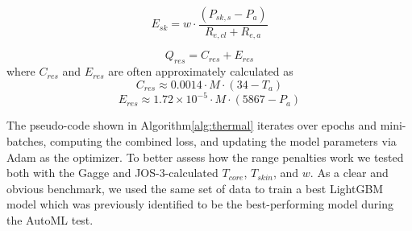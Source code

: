     \begin{equation}
        E_{sk} = w \cdot \frac{(P_{sk,s} - P_a)}{R_{e,cl} + R_{e,a}}
    \end{equation}
    
    \begin{equation}
        Q_{res} = C_{res} + E_{res}
    \end{equation}
where  $C_{res}$ and $E_{res}$ are often approximately calculated as
    \begin{equation}
        C_{res} \approx 0.0014 \cdot M \cdot (34 - T_a)
    \end{equation}
    \begin{equation}
        E_{res} \approx 1.72 \times 10^{-5} \cdot M \cdot (5867 - P_a)\label{eq:eres}
    \end{equation}

The pseudo-code shown in Algorithm\ref{alg:thermal} iterates over epochs and mini-batches, computing the combined loss, and updating the model parameters via Adam as the optimizer. To better assess how the range penalties work we tested both with the Gagge and JOS-3-calculated $T_{core}$, $T_{skin}$, and $w$. As a clear and obvious benchmark, we used the same set of data to train a best LightGBM model which was previously identified to be the best-performing model during the AutoML test. 

